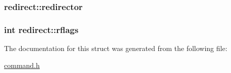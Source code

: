 \subsubsection[{\texorpdfstring{redirector}{redirector}}]{ redirect\+::redirector}\hypertarget{structredirect_a49cf28da45dc5c4dc890b71904f484fb}{}\label{structredirect_a49cf28da45dc5c4dc890b71904f484fb}
\subsubsection[{\texorpdfstring{rflags}{rflags}}]{\setlength{\rightskip}{0pt plus 5cm}int redirect\+::rflags}\hypertarget{structredirect_a0dd66f3dc5607959984565679aca5474}{}\label{structredirect_a0dd66f3dc5607959984565679aca5474}


The documentation for this struct was generated from the following file\+:\begin{DoxyCompactItemize}
\item 
\hyperlink{command_8h}{command.\+h}\end{DoxyCompactItemize}
